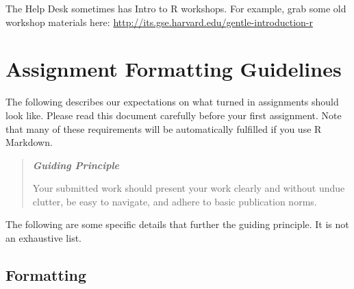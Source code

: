 \documentclass[
  letterpaper,
  DIV=11,
  numbers=noendperiod]{scrreprt}
\begin{document}
The Help Desk sometimes has Intro to R workshops. For example, grab some
old workshop materials here:
\url{http://its.gse.harvard.edu/gentle-introduction-r}


\hypertarget{assignment-formatting-guidelines}{%
\chapter*{Assignment Formatting
Guidelines}\label{assignment-formatting-guidelines}}


The following describes our expectations on what turned in assignments
should look like. Please read this document carefully before your first
assignment. Note that many of these requirements will be automatically
fulfilled if you use R Markdown.

\begin{quote}
\textbf{\emph{Guiding Principle}}

Your submitted work should present your work clearly and without undue
clutter, be easy to navigate, and adhere to basic publication norms.
\end{quote}

The following are some specific details that further the guiding
principle. It is not an exhaustive list.

\hypertarget{formatting}{%
\section*{Formatting}\label{formatting}}

\end{document}
